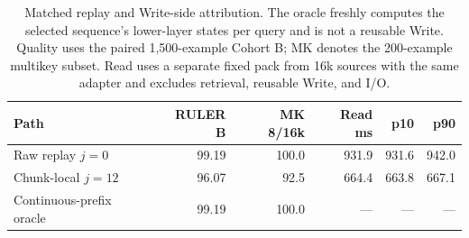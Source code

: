 \begin{table}[htbp]
\centering
\small
\setlength{\tabcolsep}{4pt}
\begin{tabular}{@{}lrrrrr@{}}
\toprule
Path & RULER B & MK 8/16k & Read ms & p10 & p90 \\
\midrule
Raw replay $j=0$ & 99.19 & 100.0 & 931.9 & 931.6 & 942.0 \\
Chunk-local $j=12$ & 96.07 & 92.5 & 664.4 & 663.8 & 667.1 \\
Continuous-prefix oracle & 99.19 & 100.0 & --- & --- & --- \\
\bottomrule
\end{tabular}
\caption{Matched replay and Write-side attribution. The oracle freshly computes the selected sequence's lower-layer states per query and is not a reusable Write. Quality uses the paired 1,500-example Cohort B; MK denotes the 200-example multikey subset. Read uses a separate fixed pack from 16k sources with the same adapter and excludes retrieval, reusable Write, and I/O.}
\label{tab:matched-detail}
\end{table}
